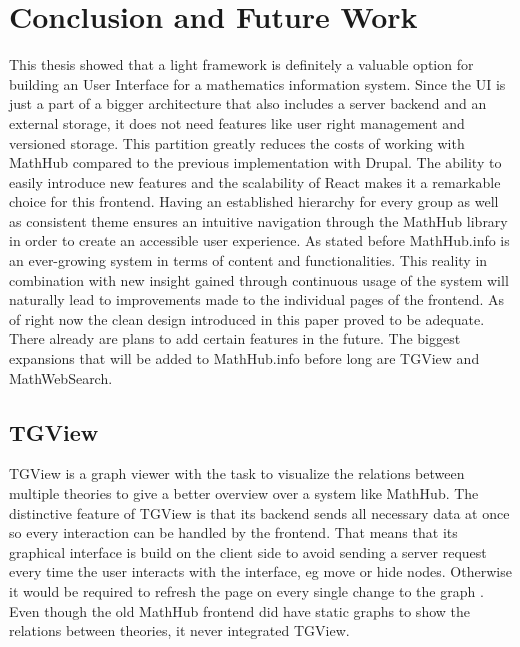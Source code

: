 \documentclass[11pt,a4paper]{article}
\begin{document}
\section{Conclusion and Future Work} \label{conclusion}
This thesis showed that a light framework is definitely a valuable option for building an User Interface for a mathematics information system.
Since the UI is just a part of a bigger architecture that also includes a server backend and an external storage, it does not need features like user right management and versioned storage.
This partition greatly reduces the costs of working with MathHub compared to the previous implementation with Drupal.
The ability to easily introduce new features and the scalability of React makes it a remarkable choice for this frontend.
\newline \newline
Having an established hierarchy for every group as well as consistent theme ensures an intuitive navigation through the MathHub library in order to create an accessible user experience.
As stated before MathHub.info is an ever-growing system in terms of content and functionalities.
This reality in combination with new insight gained through continuous usage of the system will naturally lead to improvements made to the individual pages of the frontend.
As of right now the clean design introduced in this paper proved to be adequate.
\newline \newline
There already are plans to add certain features in the future. 
The biggest expansions that will be added to MathHub.info before long are TGView and MathWebSearch.

\subsection{TGView} 
TGView is a graph viewer with the task to visualize the relations between multiple theories to give a better overview over a system like MathHub.
The distinctive feature of TGView is that its backend sends all necessary data at once so every interaction can be handled by the frontend.
That means that its graphical interface is build on the client side to avoid sending a server request every time the user interacts with the interface, eg move or hide nodes.
Otherwise it would be required to refresh the page on every single change to the graph \cite{tgview}.
\newline \newline 
Even though the old MathHub frontend did have static graphs to show the relations between theories, it never integrated TGView.
 
\end{document}
